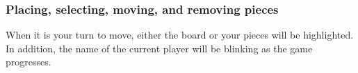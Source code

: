 \subsubsection{Placing, selecting, moving, and removing pieces}
When it is your turn to move, either the board or your pieces will be highlighted. In addition, the name of the current player will be blinking as the game progresses. \\
\begin{figure}[H]
	\centering
	\mbox{ \qquad
	}

\end{figure}
